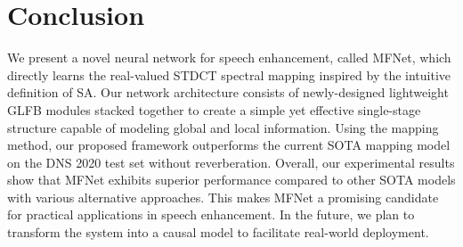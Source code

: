 \documentclass{INTERSPEECH2023}
\begin{document}
\section{Conclusion}
We present a novel neural network for speech enhancement, called MFNet, which directly learns the real-valued STDCT spectral mapping inspired by the intuitive definition of SA. Our network architecture consists of newly-designed lightweight GLFB modules stacked together to create a simple yet effective single-stage structure capable of modeling global and local information. Using the mapping method, our proposed framework outperforms the current SOTA mapping model on the DNS 2020 test set without reverberation. Overall, our experimental results show that MFNet exhibits superior performance compared to other SOTA models with various alternative approaches. This makes MFNet a promising candidate for practical applications in speech enhancement. In the future, we plan to transform the system into a causal model to facilitate real-world deployment.


\clearpage


\end{document}
